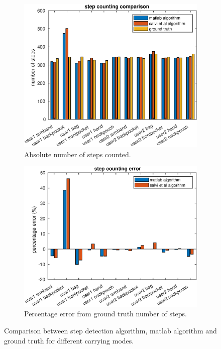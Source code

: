 \begin{figure}[H]
	\centering
	\begin{subfigure}[t]{.5\textwidth}
		\centering
		\includegraphics[width=\linewidth]{images/20200930_1214_step_counting_comparison}
		\caption{Absolute number of steps counted.}
		\label{fig:sd_abs_comparison}
	\end{subfigure}%
	\begin{subfigure}[t]{0.5\textwidth}
		\centering
		\includegraphics[width=\linewidth]{images/20200928_1248_step_counting_error}
		\caption{Percentage error from ground truth number of steps. }
		\label{fig:sd_percent_comparison}
	\end{subfigure}
	\caption{Comparison between \citet{Salvi2018} step detection algorithm, matlab algorithm and ground truth for different carrying modes.}
	\label{fig:sd_comparison}
\end{figure}

